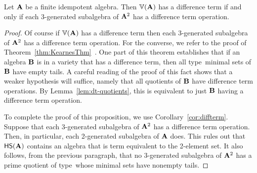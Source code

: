 \documentclass{ws-ijac}
\begin{document}
%


\begin{proposition}\label{prop:alt-poly-alg}
  Let $\mathbf{A}$ be a finite idempotent algebra.  Then $\operatorname{\mathbb{V}} (\mathbf{A})$ has a difference term if and only if each 3-generated subalgebra of $\mathbf{A}^2$ has a difference term operation.
\end{proposition}

\begin{proof}
  Of course if $\operatorname{\mathbb{V}} (\mathbf{A})$ has a difference term then each 3-generated subalgebra of
  $\mathbf{A}^2$ has a difference term operation. For the converse, we refer to the proof of
  Theorem~\ref{thm:KearnesThm}~\cite[Theorem 3.8]{MR1358491}.  One part of this theorem
  establishes that if an algebra $\mathbf{B}$ is in a variety that has a difference term,
  then all type~\atyp minimal sets of $\mathbf{B}$ have empty tails.  A careful reading of the
  proof of this fact shows that a weaker hypothesis will suffice, namely that all quotients
  of $\mathbf{B}$ have difference term operations.  By Lemma~\ref{lem:dt-quotients}, this is
  equivalent to just $\mathbf{B}$ having a difference term operation.

  To complete the proof of this proposition, we use Corollary~\ref{cor:diffterm}. Suppose that each 3-generated subalgebra of $\mathbf{A}^2$ has a difference term operation.  Then, in particular, each 2-generated subalgebra of $\mathbf{A}$ does.  This rules out that $\mathsf{H} \mathsf{S} (\mathbf{A})$ contains an algebra that is term equivalent to the 2-element set.  It also follows, from the previous paragraph, that no 3-generated subalgebra of $\mathbf{A}^2$ has a prime quotient of type~\atyp whose minimal sets have nonempty tails.
\end{proof}
\end{document}

